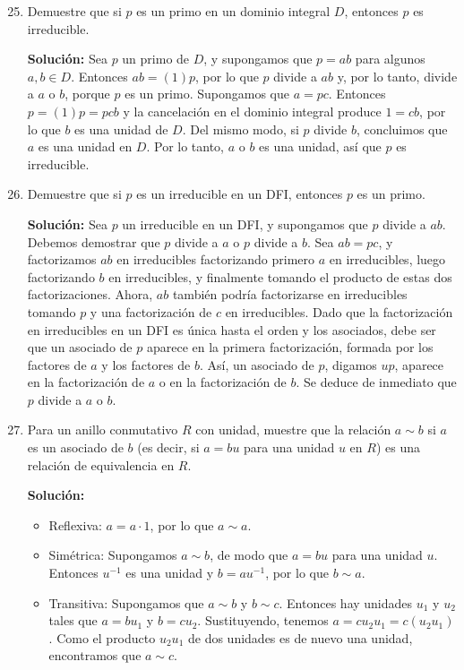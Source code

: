 \begin{enumerate}
    \setcounter{enumi}{24}
    \item Demuestre que si \( p \) es un primo en un dominio integral \( D \), entonces \( p \) es irreducible.
    
    \textbf{Solución:} Sea \( p \) un primo de \( D \), y supongamos que \( p = ab \) para algunos \( a, b \in D \). Entonces \( ab = (1)p \), por lo que \( p \) divide a \( ab \) y, por lo tanto, divide a \( a \) o \( b \), porque \( p \) es un primo. Supongamos que \( a = pc \). Entonces \( p = (1)p = pcb \) y la cancelación en el dominio integral produce \( 1 = cb \), por lo que \( b \) es una unidad de \( D \). Del mismo modo, si \( p \) divide \( b \), concluimos que \( a \) es una unidad en \( D \). Por lo tanto, \( a \) o \( b \) es una unidad, así que \( p \) es irreducible.
    
    \item Demuestre que si \( p \) es un irreducible en un DFI, entonces \( p \) es un primo.
    
    \textbf{Solución:} Sea \( p \) un irreducible en un DFI, y supongamos que \( p \) divide a \( ab \). Debemos demostrar que \( p \) divide a \( a \) o \( p \) divide a \( b \). Sea \( ab = pc \), y factorizamos \( ab \) en irreducibles factorizando primero \( a \) en irreducibles, luego factorizando \( b \) en irreducibles, y finalmente tomando el producto de estas dos factorizaciones. Ahora, \( ab \) también podría factorizarse en irreducibles tomando \( p \) y una factorización de \( c \) en irreducibles. Dado que la factorización en irreducibles en un DFI es única hasta el orden y los asociados, debe ser que un asociado de \( p \) aparece en la primera factorización, formada por los factores de \( a \) y los factores de \( b \). Así, un asociado de \( p \), digamos \( up \), aparece en la factorización de \( a \) o en la factorización de \( b \). Se deduce de inmediato que \( p \) divide a \( a \) o \( b \).

    \item Para un anillo conmutativo \( R \) con unidad, muestre que la relación \( a \sim b \) si \( a \) es un asociado de \( b \) (es decir, si \( a = bu \) para una unidad \( u \) en \( R \)) es una relación de equivalencia en \( R \).
    
    \textbf{Solución:}
    \begin{itemize}
        \item Reflexiva: \( a = a \cdot 1 \), por lo que \( a \sim a \).
        \item Simétrica: Supongamos \( a \sim b \), de modo que \( a = bu \) para una unidad \( u \). Entonces \( u^{-1} \) es una unidad y \( b = au^{-1} \), por lo que \( b \sim a \).
        \item Transitiva: Supongamos que \( a \sim b \) y \( b \sim c \). Entonces hay unidades \( u_1 \) y \( u_2 \) tales que \( a = bu_1 \) y \( b = cu_2 \). Sustituyendo, tenemos \( a = cu_2 u_1 = c(u_2 u_1) \). Como el producto \( u_2 u_1 \) de dos unidades es de nuevo una unidad, encontramos que \( a \sim c \).
    \end{itemize}


\end{enumerate}
